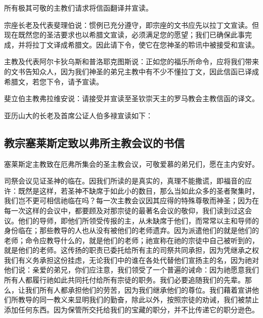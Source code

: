 所有极其可敬的主教们请求将信函翻译并宣读。\par

宗座长老及代表斐理伯说：惯例已充分遵守，即宗座的文书应先以拉丁文宣读。但现在既然您的圣洁要求也以希腊文宣读，必须满足您的愿望；我们已确保此事完成，并将拉丁文译成希腊文。因此请下令，使它在您神圣的聆讯中被接受和宣读。\par

主教及代表阿尔卡狄乌斯和普洛耶克图斯说：正如您的福乐所命令，应将我们带来的文书告知众人，因为我们神圣的弟兄主教中有不少不懂拉丁文，因此信函已译成希腊文，若您下令，请予宣读。\par

斐立伯主教弗拉维安说：请接受并宣读至圣钦崇天主的罗马教会主教信函的译文。\par

亚历山大的长老及首席公证人伯多禄宣读如下：\par


\subsection{教宗塞莱斯定致以弗所主教会议的书信}

塞莱斯定主教致在厄弗所集会的圣主教会议，可敬爱慕的弟兄们，愿在主内安好。\par

司祭会议见证圣神的临在。因我们所读的是真实的，真理不能撒谎，即福音的应许：既然是这样，若圣神不缺席于如此小的数目，那么当如此众多的圣者聚集时，我们岂不更可相信祂临在吗？每一次主教会议因其应得的特殊尊敬而神圣；因为在每一次这样的会议中，都要顾及对那宗徒的最著名会议的敬仰，我们读到过这会议。他们的导师，即他们所领受传报的主，从未缺席于他们，而常常以主和导师的身份临在；那些教导的人也从没有被他们的老师遗弃。因为派遣他们的就是他们的老师；命令应教导什么的，就是他们的老师；祂宣称在祂的宗徒中自己被听到的，就是他们的老师。这传扬的职责已委托给所有主的司祭共同承担，因为凭继承之权我们有义务承担这份挂虑，无论我们中的谁在各处代替他们宣扬主的名，因为祂对他们说：亲爱的弟兄，你们应注意，我们领受了一个普遍的诫命：因为祂愿意我们所有人都履行祂如此共同托付给所有宗徒的职务。我们必要追随我们的先辈。那么，让我们所有人都承担他们的劳苦，因为我们继承他们的尊位。我们藉着宣讲他们所教导的同一教义来显明我们的勤奋，除此以外，按照宗徒的劝诫，我们被禁止添加任何东西。因为保管所交托给我们的宝藏的职分，并不比传递它的职分逊色。\par

